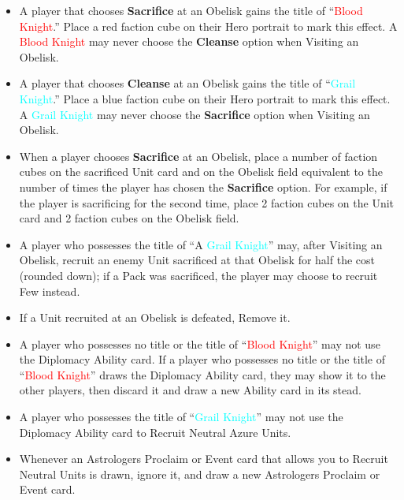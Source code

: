\begin{multicols*}{2}
\begin{itemize}
\begin{enumerate}
\begin{enumerate}
            \item {}: Gain 18 , 9 , and 3 . Additionally, \textbf{Search (2)} the Relic card deck. Finally, if the Unit Card was on the Pack side, \textbf{Search (2)} the Azure Unit deck; you may Recruit one of these Units for half the cost (rounded down).
        \end{enumerate}
    \end{enumerate}
    \item A player that chooses \textbf{Sacrifice} at an Obelisk gains the title of “\textcolor{red}{Blood Knight}.” Place a red faction cube on their Hero portrait to mark this effect. A \textcolor{red}{Blood Knight} may never choose the \textbf{Cleanse} option when Visiting an Obelisk.
    \item A player that chooses \textbf{Cleanse} at an Obelisk gains the title of “\textcolor{cyan}{Grail Knight}.” Place a blue faction cube on their Hero portrait to mark this effect. A \textcolor{cyan}{Grail Knight} may never choose the \textbf{Sacrifice} option when Visiting an Obelisk.
    \item When a player chooses \textbf{Sacrifice} at an Obelisk, place a number of faction cubes on the sacrificed Unit card and on the Obelisk field equivalent to the number of times the player has chosen the \textbf{Sacrifice} option. For example, if the player is sacrificing for the second time, place 2 faction cubes on the Unit card and 2 faction cubes on the Obelisk field.
    \item A player who possesses the title of “A \textcolor{cyan}{Grail Knight}” may, after Visiting an Obelisk, recruit an enemy Unit sacrificed at that Obelisk for half the cost (rounded down); if a Pack was sacrificed, the player may choose to recruit Few instead.
    \item If a Unit recruited at an Obelisk is defeated, Remove it.
    \item A player who possesses no title or the title of “\textcolor{red}{Blood Knight}” may not use the Diplomacy Ability card. If a player who possesses no title or the title of “\textcolor{red}{Blood Knight}” draws the Diplomacy Ability card, they may show it to the other players, then discard it and draw a new Ability card in its stead.
    \item A player who possesses the title of “\textcolor{cyan}{Grail Knight}” may not use the Diplomacy Ability card to Recruit Neutral Azure Units.
    \item Whenever an Astrologers Proclaim or Event card that allows you to Recruit Neutral Units is drawn, ignore it, and draw a new Astrologers Proclaim or Event card.

\end{itemize}
\end{multicols*}
